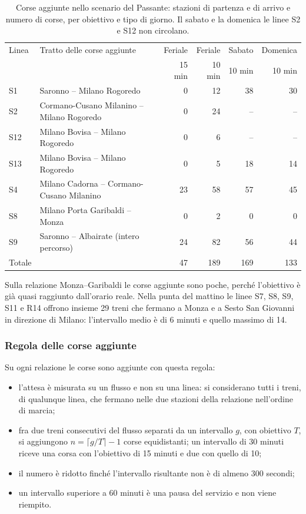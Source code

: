 \begin{table}[H]
	\centering
	\caption{Corse aggiunte nello scenario del Passante: stazioni di partenza e di arrivo e numero di corse, per obiettivo e tipo di giorno. Il sabato e la domenica le linee S2 e S12 non circolano.}
	\label{tab:scenari-tratti}
	\begin{tabularx}{\textwidth}{lXrrrr}
		\toprule
		Linea & Tratto delle corse aggiunte & Feriale & Feriale & Sabato & Domenica \\
		 & & 15 min & 10 min & 10 min & 10 min \\
		\midrule
		S1 & Saronno -- Milano Rogoredo & 0 & 12 & 38 & 30 \\
		S2 & Cormano-Cusano Milanino -- Milano Rogoredo & 0 & 24 & -- & -- \\
		S12 & Milano Bovisa -- Milano Rogoredo & 0 & 6 & -- & -- \\
		S13 & Milano Bovisa -- Milano Rogoredo & 0 & 5 & 18 & 14 \\
		S4 & Milano Cadorna -- Cormano-Cusano Milanino & 23 & 58 & 57 & 45 \\
		S8 & Milano Porta Garibaldi -- Monza & 0 & 2 & 0 & 0 \\
		S9 & Saronno -- Albairate (intero percorso) & 24 & 82 & 56 & 44 \\
		\midrule
		Totale & & 47 & 189 & 169 & 133 \\
		\bottomrule
	\end{tabularx}
\end{table}

Sulla relazione Monza--Garibaldi le corse aggiunte sono poche, perché l'obiettivo è già quasi raggiunto dall'orario reale. Nella punta del mattino le linee S7, S8, S9, S11 e R14 offrono insieme 29 treni che fermano a Monza e a Sesto San Giovanni in direzione di Milano: l'intervallo medio è di 6 minuti e quello massimo di 14.

\subsubsection{Regola delle corse aggiunte}
Su ogni relazione le corse sono aggiunte con questa regola:
\begin{itemize}
	\item l'attesa è misurata su un flusso e non su una linea: si considerano tutti i treni, di qualunque linea, che fermano nelle due stazioni della relazione nell'ordine di marcia;
	\item fra due treni consecutivi del flusso separati da un intervallo $g$, con obiettivo $T$, si aggiungono $n = \lceil g/T \rceil - 1$ corse equidistanti; un intervallo di 30 minuti riceve una corsa con l'obiettivo di 15 minuti e due con quello di 10;
	\item il numero è ridotto finché l'intervallo risultante non è di almeno 300 secondi;
	\item un intervallo superiore a 60 minuti è una pausa del servizio e non viene riempito.
\end{itemize}

